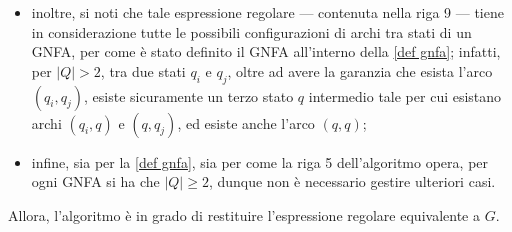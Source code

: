 \documentclass[a4paper, 12pt]{report}
\begin{document}
{\begin{itemize}
\begin{figure}[H]
                \end{figure}

                poiché l'arco che $q$ ha su sé stesso è stato descritto attraverso $(R_2)^*$, gli archi $(q_i, q)$ e $(q, q_j)$ sono stati inseriti per concatenazione, ed infine è stato unito l'altro possibile cammino verso $q_j$ tramite unione;

            \item inoltre, si noti che tale espressione regolare --- contenuta nella riga 9 --- tiene in considerazione tutte le possibili configurazioni di archi tra stati di un GNFA, per come è stato definito il GNFA all'interno della \cref{def gnfa}; infatti, per $|Q| > 2$, tra due stati $q_i$ e $q_j$, oltre ad avere la garanzia che esista l'arco $(q_i, q_j)$, esiste sicuramente un terzo stato $q$ intermedio tale per cui esistano archi $(q_i, q)$ e $(q, q_j)$, ed esiste anche l'arco $(q,q)$;

            \item infine, sia per la \cref{def gnfa}, sia per come la riga 5 dell'algoritmo opera, per ogni GNFA si ha che $|Q| \ge 2$, dunque non è necessario gestire ulteriori casi.
        \end{itemize}

        Allora, l'algoritmo è in grado di restituire l'espressione regolare equivalente a $G$.
    }
\end{document}
